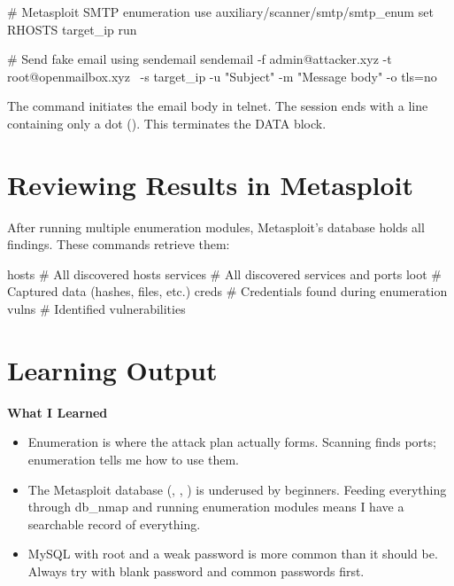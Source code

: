\begin{notebox}
\begin{termbox}
# Metasploit SMTP enumeration
use auxiliary/scanner/smtp/smtp_enum
set RHOSTS target_ip
run

# Send fake email using sendemail
sendemail -f admin@attacker.xyz -t root@openmailbox.xyz \
  -s target_ip -u "Subject" -m "Message body" -o tls=no
\end{termbox}

\begin{notebox}
The  command initiates the email body in telnet. The session ends with
a line containing only a dot (\ic{.}). This terminates the DATA block.
\end{notebox}

\section{Reviewing Results in Metasploit}
\label{sec:msf_results}

After running multiple enumeration modules, Metasploit's database holds all
findings. These commands retrieve them:

\begin{termbox}
hosts      # All discovered hosts
services   # All discovered services and ports
loot       # Captured data (hashes, files, etc.)
creds      # Credentials found during enumeration
vulns      # Identified vulnerabilities
\end{termbox}

\section{Learning Output}

\begin{takebox}
\textbf{What I Learned}
\begin{itemize}
  \item Enumeration is where the attack plan actually forms. Scanning finds ports;
        enumeration tells me how to use them.
  \item The Metasploit database (, , ) is
        underused by beginners. Feeding everything through db\_nmap and running
        enumeration modules means I have a searchable record of everything.
  \item MySQL with root and a weak password is more common than it should be.
        Always try \ic{root} with blank password and common passwords first.
\end{itemize}


\end{takebox}
\end{notebox}
